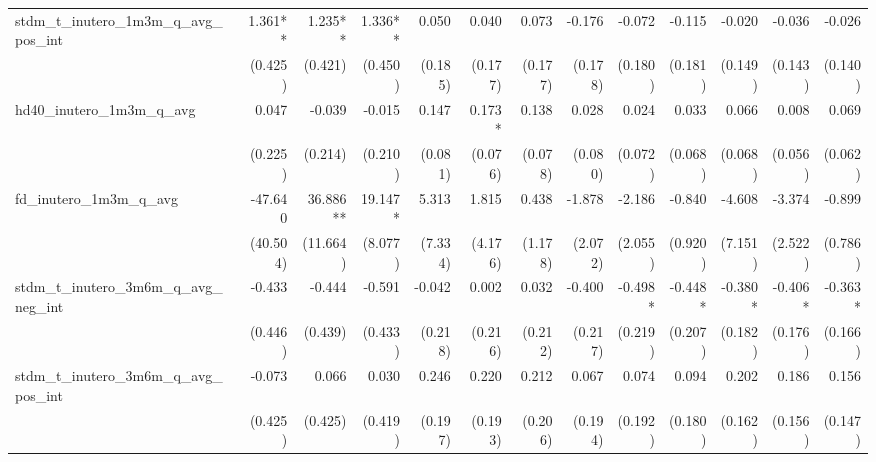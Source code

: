 \begin{tabular}{lrrrrrrrrrrrr}
stdm\_t\_inutero\_1m3m\_q\_avg\_pos\_int    &      1.361** &      1.235** &      1.336** &        0.050 &        0.040 &        0.073 &       -0.176 &       -0.072 &       -0.115 &       -0.020 &       -0.036 &       -0.026 \\ 
                                            &      (0.425) &      (0.421) &      (0.450) &      (0.185) &      (0.177) &      (0.177) &      (0.178) &      (0.180) &      (0.181) &      (0.149) &      (0.143) &      (0.140) \\ 
hd40\_inutero\_1m3m\_q\_avg                 &        0.047 &       -0.039 &       -0.015 &        0.147 &       0.173* &        0.138 &        0.028 &        0.024 &        0.033 &        0.066 &        0.008 &        0.069 \\ 
                                            &      (0.225) &      (0.214) &      (0.210) &      (0.081) &      (0.076) &      (0.078) &      (0.080) &      (0.072) &      (0.068) &      (0.068) &      (0.056) &      (0.062) \\ 
fd\_inutero\_1m3m\_q\_avg                   &      -47.640 &     36.886** &      19.147* &        5.313 &        1.815 &        0.438 &       -1.878 &       -2.186 &       -0.840 &       -4.608 &       -3.374 &       -0.899 \\ 
                                            &     (40.504) &     (11.664) &      (8.077) &      (7.334) &      (4.176) &      (1.178) &      (2.072) &      (2.055) &      (0.920) &      (7.151) &      (2.522) &      (0.786) \\ 
stdm\_t\_inutero\_3m6m\_q\_avg\_neg\_int    &       -0.433 &       -0.444 &       -0.591 &       -0.042 &        0.002 &        0.032 &       -0.400 &      -0.498* &      -0.448* &      -0.380* &      -0.406* &      -0.363* \\ 
                                            &      (0.446) &      (0.439) &      (0.433) &      (0.218) &      (0.216) &      (0.212) &      (0.217) &      (0.219) &      (0.207) &      (0.182) &      (0.176) &      (0.166) \\ 
stdm\_t\_inutero\_3m6m\_q\_avg\_pos\_int    &       -0.073 &        0.066 &        0.030 &        0.246 &        0.220 &        0.212 &        0.067 &        0.074 &        0.094 &        0.202 &        0.186 &        0.156 \\ 
                                            &      (0.425) &      (0.425) &      (0.419) &      (0.197) &      (0.193) &      (0.206) &      (0.194) &      (0.192) &      (0.180) &      (0.162) &      (0.156) &      (0.147) \\ 

\end{tabular}
